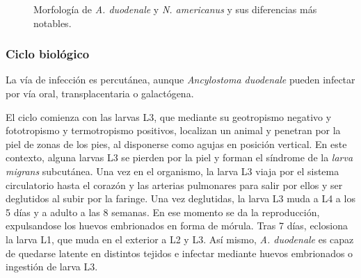 \begin{figure}[H]
	\centering
	\caption[Morfología de \textit{A. duodenale} y \textit{N. americanus}]{Morfología de \textit{A. duodenale} y \textit{N. americanus} y sus diferencias más notables.}
\end{figure}
\subsubsection{Ciclo biológico}
La vía de infección es percutánea, aunque \textit{Ancylostoma duodenale} pueden infectar por vía oral, transplacentaria o galactógena.

El ciclo comienza con las larvas L3, que mediante su geotropismo negativo y fototropismo y termotropismo positivos, localizan un animal y penetran por la piel de zonas de los pies, al disponerse como agujas en posición vertical. En este contexto, alguna larvas L3 se pierden por la piel y forman el síndrome de la \textit{larva migrans} subcutánea. Una vez en el organismo, la larva L3 viaja por el sistema circulatorio hasta el corazón y las arterias pulmonares para salir por ellos y ser deglutidos al subir por la faringe. Una vez deglutidas, la larva L3 muda a L4 a los 5 días y a adulto a las 8 semanas. En ese momento se da la reproducción, expulsandose los huevos embrionados en forma de mórula. Tras 7 días, eclosiona la larva L1, que muda en el exterior a L2 y L3. Así mismo, \textit{A. duodenale} es capaz de quedarse latente en distintos tejidos e infectar mediante huevos embrionados o ingestión de larva L3.

